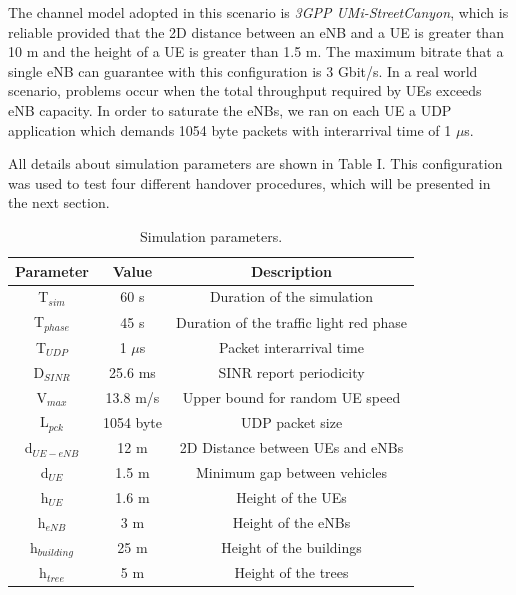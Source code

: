 \documentclass[conference,10pt]{IEEEtran}
\begin{document}
The channel model adopted in this scenario is \emph{3GPP UMi-StreetCanyon}, which is reliable provided that the 2D distance between an eNB and a UE is greater than 10 m and the height of a UE is greater than 1.5 m. The maximum bitrate that a single eNB can guarantee with this configuration is 3 Gbit/s. In a real world scenario, problems occur when the total throughput required by UEs exceeds eNB capacity. In order to saturate the eNBs, we ran on each UE a UDP application which demands 1054 byte packets with interarrival time of 1 $\mu$s.

All details about simulation parameters are shown in Table I. This configuration was used to test four different handover procedures, which will be presented in the next section.

\begin{table}[t]
	\begin{center}
		\begin{tabular}{ccc}
			\toprule
			
			Parameter & Value & Description  \\
			\midrule
			
			T$_{sim}$ & 60 s & Duration of the simulation \\
			T$_{phase}$  & 45 s & Duration of the traffic light red phase \\
			T$_{UDP}$ & 1 $\mu$s & Packet interarrival time \\
			D$_{SINR}$ & 25.6 ms & SINR report periodicity \\	
			V$_{max}$ &  13.8 m/s & Upper bound for random UE speed \\
			L$_{pck}$ & 1054 byte & UDP packet size \\
			d$_{UE-eNB}$ & 12 m & 2D Distance between UEs and eNBs \\		
			d$_{UE}$ & 1.5 m & Minimum gap between vehicles \\
			h$_{UE}$ & 1.6 m & Height of the UEs \\
			h$_{eNB}$ & 3 m & Height of the eNBs \\
			h$_{building}$ & 25 m & Height of the buildings \\
			h$_{tree}$ & 5 m & Height of the trees \\
			\bottomrule
		\end{tabular}
	\end{center}
	\vspace*{-2pt}
	\caption{Simulation parameters.}
    \vspace*{-6.5pt}
\end{table}
\end{document}
